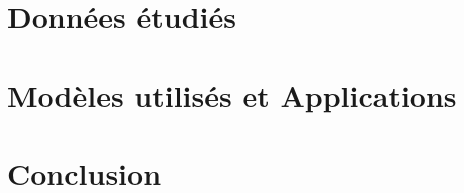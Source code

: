 \documentclass[a4paper, oneside, 12pt, final]{extreport}
\begin{document}
\chapter{Données étudiés}%
\label{chap:1}


\chapter{Modèles utilisés et Applications}
\label{chap:2}



\chapter*{Conclusion}
\label{chap:conclusion}


\newpage
\renewcommand{\thepage}{\Alph{page}}

% 





\printglossary[type=\acronymtype, title={Liste des acronymes}]


\appendix




\nocite{*}


\cleardoublepage

\end{document}
